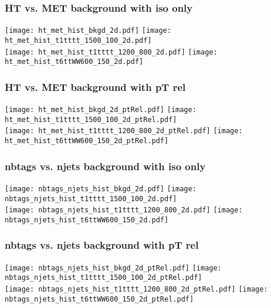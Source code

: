 \documentclass{beamer}
\begin{document}
\begin{frame}
\frametitle{HT vs. MET background with iso only}
\texttt{[image: ht\_met\_hist\_bkgd\_2d.pdf]}
\texttt{[image: ht\_met\_hist\_t1tttt\_1500\_100\_2d.pdf]} \\
\texttt{[image: ht\_met\_hist\_t1tttt\_1200\_800\_2d.pdf]} 
\texttt{[image: ht\_met\_hist\_t6ttWW600\_150\_2d.pdf]} 
\end{frame}

\begin{frame}
\frametitle{HT vs. MET background with pT rel}
\texttt{[image: ht\_met\_hist\_bkgd\_2d\_ptRel.pdf]}
\texttt{[image: ht\_met\_hist\_t1tttt\_1500\_100\_2d\_ptRel.pdf]} \\
\texttt{[image: ht\_met\_hist\_t1tttt\_1200\_800\_2d\_ptRel.pdf]} 
\texttt{[image: ht\_met\_hist\_t6ttWW600\_150\_2d\_ptRel.pdf]} 
\end{frame}

\begin{frame}
\frametitle{nbtags vs. njets background with iso only}
\texttt{[image: nbtags\_njets\_hist\_bkgd\_2d.pdf]}
\texttt{[image: nbtags\_njets\_hist\_t1tttt\_1500\_100\_2d.pdf]} \\
\texttt{[image: nbtags\_njets\_hist\_t1tttt\_1200\_800\_2d.pdf]} 
\texttt{[image: nbtags\_njets\_hist\_t6ttWW600\_150\_2d.pdf]} 
\end{frame}

\begin{frame}
\frametitle{nbtags vs. njets background with pT rel}
\texttt{[image: nbtags\_njets\_hist\_bkgd\_2d\_ptRel.pdf]}
\texttt{[image: nbtags\_njets\_hist\_t1tttt\_1500\_100\_2d\_ptRel.pdf]} \\
\texttt{[image: nbtags\_njets\_hist\_t1tttt\_1200\_800\_2d\_ptRel.pdf]} 
\texttt{[image: nbtags\_njets\_hist\_t6ttWW600\_150\_2d\_ptRel.pdf]} 
\end{frame}
\end{document}
